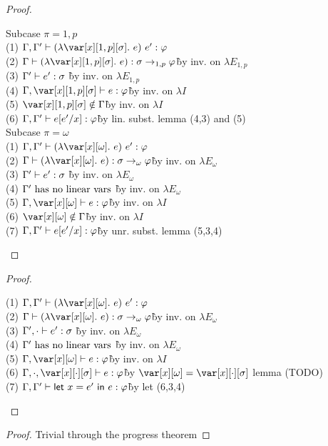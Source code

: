 \BetaReductionTheorem

\begin{proof}~

\begin{tabbing}
    Subcase $\pi = 1,p$\\
    (1) $\G,\G' \vdash (\lambda \x[1,p][\s].~e)~e' : \vp$\\
    (2) $\G \vdash (\lambda \x[1,p][\s].~e) : \s \to_{1,p} \vp$\` by inv. on $\lambda E_{1,p}$\\
    (3) $\Gamma' \vdash e' : \sigma$ \` by inv. on $\lambda E_{1,p}$\\
    (4) $\G,\x[1,p][\s] \vdash e : \vp $\`by inv. on $\lambda I$\\
    (5) $\x[1,p][\s] \notin \G$\`by inv. on $\lambda I$\\
    (6) $\Gamma,\Gamma' \vdash e[e'/x] : \varphi$\` by lin. subst. lemma (4,3) and (5)\\
    Subcase $\pi = \omega$\\
    (1) $\G,\G' \vdash (\lambda \xo.~e)~e' : \vp$\\
    (2) $\G \vdash (\lambda \xo.~e) : \s \to_\omega \vp$\` by inv. on $\lambda E_\omega$\\
    (3) $\Gamma' \vdash e' : \sigma$ \` by inv. on $\lambda E_\omega$\\
    (4) $\Gamma' ~\textrm{has no linear vars}$ \` by inv. on $\lambda E_\omega$\\
    (5) $\G,\xo \vdash e : \vp$\` by inv. on $\lambda I$\\
    (6) $\xo \notin \G$\` by inv. on $\lambda I$\\
    (7) $\Gamma,\Gamma' \vdash e[e'/x] : \varphi$\` by unr. subst. lemma (5,3,4)\\
\end{tabbing}
\end{proof}

\BetaReductionSharingTheorem

\begin{proof}~

\begin{tabbing}
    (1) $\G,\G' \vdash (\lambda \xo.~e)~e' : \vp$\\
    (2) $\G \vdash (\lambda \xo.~e) : \s \to_\omega \vp$\` by inv. on $\lambda E_\omega$\\
    (3) $\Gamma', \cdot \vdash e' : \sigma$ \` by inv. on $\lambda E_\omega$\\
    (4) $\Gamma' ~\textrm{has no linear vars}$ \` by inv. on $\lambda E_\omega$\\
    (5) $\G,\xo \vdash e : \vp$\` by inv. on $\lambda I$\\
    (6) $\G, \cdot, \x[\cdot][\s] \vdash e : \vp$\` by $\xo = \x[\cdot][\s]$ lemma (TODO)\\
    (7) $\Gamma,\Gamma' \vdash \mathsf{let}~x = e'~\mathsf{in}~e : \varphi$\` by let (6,3,4)\\
\end{tabbing}
\end{proof}

\BetaReductionMultTheorem

\begin{proof}
    Trivial through the progress theorem
\end{proof}


